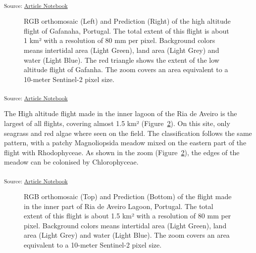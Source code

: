 \documentclass[
  number]{elsarticle}
\begin{document}
\textsubscript{Source:
\href{https://SigOiry.github.io/Drone_Paper_2023/index.qmd.html}{Article
Notebook}}

\label{cell-fig-GafHigh}
\begin{figure}[H]


\caption{\label{fig-GafHigh}RGB orthomosaic (Left) and Prediction
(Right) of the high altitude flight of Gafanaha, Portugal. The total
extent of this flight is about 1 km² with a resolution of 80 mm per
pixel. Background colors means intertidal area (Light Green), land area
(Light Grey) and water (Light Blue). The red triangle shows the extent
of the low altitude flight of Gafanha. The zoom covers an area
equivalent to a 10-meter Sentinel-2 pixel size.}

\end{figure}%

\textsubscript{Source:
\href{https://SigOiry.github.io/Drone_Paper_2023/index.qmd.html}{Article
Notebook}}

The High altitude flight made in the inner lagoon of the Ria de Aveiro
is the largest of all flights, covering almost 1.5 km²
(Figure~\ref{fig-Boat}). On this site, only seagrass and red algae where
seen on the field. The classification follows the same pattern, with a
patchy Magnoliopsida meadow mixed on the eastern part of the flight with
Rhodophyceae. As shown in the zoom (Figure~\ref{fig-Boat}), the edges of
the meadow can be colonised by Chlorophyceae.

\textsubscript{Source:
\href{https://SigOiry.github.io/Drone_Paper_2023/index.qmd.html}{Article
Notebook}}

\label{cell-fig-Boat}
\begin{figure}[H]


\caption{\label{fig-Boat}RGB orthomosaic (Top) and Prediction (Bottom)
of the flight made in the inner part of Ria de Aveiro Lagoon, Portugal.
The total extent of this flight is about 1.5 km² with a resolution of 80
mm per pixel. Background colors means intertidal area (Light Green),
land area (Light Grey) and water (Light Blue). The zoom covers an area
equivalent to a 10-meter Sentinel-2 pixel size.}

\end{figure}%
\end{document}
